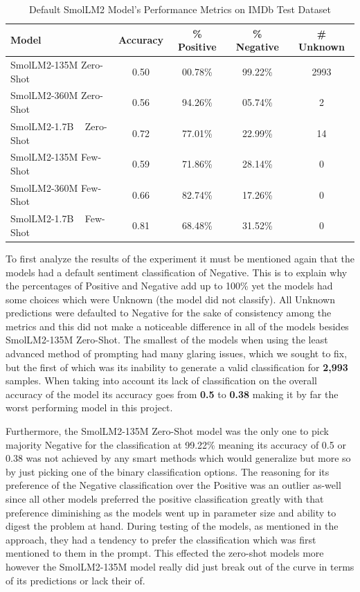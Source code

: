 \documentclass[10pt,twocolumn,letterpaper]{article}
\begin{document}
\begin{table}[ht]
\centering
\begin{tabular}{|l|c|c|c|c|}
\hline
\textbf{Model} & \textbf{Accuracy} & \textbf{\% Positive} & \textbf{\% Negative} & \textbf{\# Unknown} \\ 
\hline\hline
SmolLM2-135M Zero-Shot   & 0.50 & 00.78\%  & 99.22\% & 2993 \\ 
SmolLM2-360M Zero-Shot   & 0.56 & 94.26\%  & 05.74\% & 2    \\ 
SmolLM2-1.7B ~ Zero-Shot   & 0.72 & 77.01\%  & 22.99\% & 14   \\ 
SmolLM2-135M Few-Shot    & 0.59 & 71.86\%  & 28.14\% & 0    \\ 
SmolLM2-360M Few-Shot    & 0.66 & 82.74\%  & 17.26\% & 0    \\ 
SmolLM2-1.7B ~ Few-Shot    & 0.81 & 68.48\%  & 31.52\% & 0    \\ 
\hline
\end{tabular}
\caption{Default SmolLM2 Model's Performance Metrics on IMDb Test Dataset}
\label{tab:default-SmolLM2-metrics}
\end{table}

To first analyze the results of the experiment it must be mentioned again that the models had a default sentiment classification of Negative. This is to explain why the percentages of Positive and Negative add up to 100\% yet the models had some choices which were Unknown (the model did not classify). All Unknown predictions were defaulted to Negative for the sake of consistency among the metrics and this did not make a noticeable difference in all of the models besides SmolLM2-135M Zero-Shot. The smallest of the models when using the least advanced method of prompting had many glaring issues, which we sought to fix, but the first of which was its inability to generate a valid classification for \textbf{2,993} samples. When taking into account its lack of classification on the overall accuracy of the model its accuracy goes from \textbf{0.5} to \textbf{0.38} making it by far the worst performing model in this project. 

Furthermore, the SmolLM2-135M Zero-Shot model was the only one to pick majority Negative for the classification at 99.22\% meaning its accuracy of 0.5 or 0.38 was not achieved by any smart methods which would generalize but more so by just picking one of the binary classification options. The reasoning for its preference of the Negative classification over the Positive was an outlier as-well since all other models preferred the positive classification greatly with that preference diminishing as the models went up in parameter size and ability to digest the problem at hand. During testing of the models, as mentioned in the approach, they had a tendency to prefer the classification which was first mentioned to them in the prompt. This effected the zero-shot models more however the SmolLM2-135M model really did just break out of the curve in terms of its predictions or lack their of. 
\end{document}
